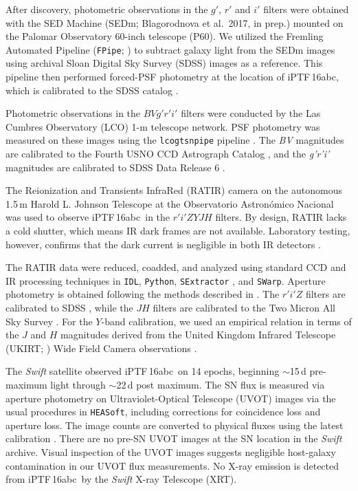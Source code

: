 \documentclass[twocolumn]{aastex61}
\newcommand{\abc}{iPTF\,16abc}
\begin{document}
After discovery, photometric observations in the $g'$, $r'$ and $i'$
filters were obtained with the SED Machine 
(SEDm; Blagorodnova et al.\ 2017, in prep.) mounted on the Palomar Observatory 
60-inch telescope (P60). We utilized the Fremling Automated Pipeline (\texttt{FPipe}; \citealt{2016A&A...593A..68F}) to subtract galaxy light from the SEDm images using archival Sloan Digital Sky Survey (SDSS) images as a reference. This pipeline then performed forced-PSF photometry at the location of \abc, which is calibrated to the SDSS catalog \citep{2014ApJS..211...17A}.

Photometric observations in the $BVg'r'i'$ filters were conducted by the Las Cumbres Observatory (LCO) 1-m
telescope network.  PSF photometry was measured on these images using
the \texttt{lcogtsnpipe} pipeline \citep{2016MNRAS.459.3939V}. The
\textit{BV} magnitudes are calibrated to the Fourth USNO CCD
Astrograph Catalog \citep{2013AJ....145...44Z}, and the \textit{g'r'i'}
magnitudes are calibrated to SDSS Data Release 6
\citep{2008ApJS..175..297A}.

The Reionization and Transients InfraRed (RATIR) camera on the autonomous 1.5\,m Harold L. Johnson Telescope at the Observatorio Astron\'{o}mico Nacional \citep{2012SPIE.8446E..10B,2012SPIE.8444E..5LW} was used to observe \abc\ in the $r'i'ZYJH$ filters. By design, RATIR lacks a cold shutter, which means IR dark frames are not available. Laboratory testing, however, confirms that the dark current is negligible in both IR detectors \citep{2012SPIE.8453E..1OF}.

The RATIR data were reduced, coadded, and analyzed using standard CCD and IR processing techniques in \texttt{IDL}, \texttt{Python}, \texttt{SExtractor} \citep{1996A&AS..117..393B}, and \texttt{SWarp}. Aperture photometry is obtained following the methods described in \citet{2014AJ....148....2L}. The $r'i'Z$ filters are calibrated to SDSS \citep{2014ApJS..211...17A}, while the $JH$ filters are calibrated to the Two Micron All Sky Survey \citep{2006AJ....131.1163S}. For the $Y$-band calibration, we used an empirical relation in terms of the $J$ and $H$ magnitudes derived from the United Kingdom Infrared Telescope (UKIRT; \citealt{2007A&A...467..777C}) Wide Field Camera observations \citep{2009MNRAS.394..675H}.

The \textit{Swift} satellite observed \abc\ on 14 epochs, beginning 
$\sim$15\,d pre-maximum light through $\sim$22\,d post maximum. The SN 
flux is measured via aperture photometry on Ultraviolet-Optical
Telescope (UVOT) images via the usual procedures in 
\texttt{HEASoft}, including corrections for coincidence loss and 
aperture loss. The image counts
are converted to physical fluxes using the latest calibration
\citep{2011AIPC.1358..373B}. There are no pre-SN UVOT images at the 
SN location in the \textit{Swift} archive.  Visual inspection of the
UVOT images suggests negligible host-galaxy contamination in our 
UVOT flux measurements. No X-ray emission is detected from \abc\ by the \textit{Swift} X-ray Telescope (XRT).
\end{document}
